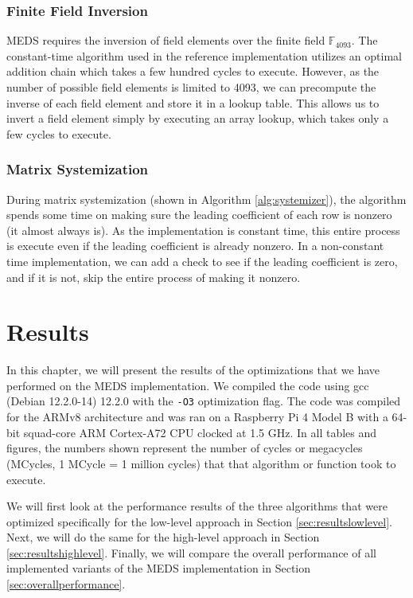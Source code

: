 \documentclass[11pt,a4paper]{report}
\theoremstyle{definition}
\begin{document}
\subsection{Finite Field Inversion}
MEDS requires the inversion of field elements over the finite field $\mathbb{F}_{4093}$. The constant-time algorithm used in the reference implementation utilizes an optimal addition chain which takes a few hundred cycles to execute. However, as the number of possible field elements is limited to 4093, we can precompute the inverse of each field element and store it in a lookup table. This allows us to invert a field element simply by executing an array lookup, which takes only a few cycles to execute.

\subsection{Matrix Systemization}
During matrix systemization (shown in Algorithm \ref{alg:systemizer}), the algorithm spends some time on making sure the leading coefficient of each row is nonzero (it almost always is). As the implementation is constant time, this entire process is execute even if the leading coefficient is already nonzero. In a non-constant time implementation, we can add a check to see if the leading coefficient is zero, and if it is not, skip the entire process of making it nonzero.

\chapter{Results}
\label{ch:results}
In this chapter, we will present the results of the optimizations that we have performed on the MEDS implementation. We compiled the code using gcc (Debian 12.2.0-14) 12.2.0 with the \texttt{-O3} optimization flag. The code was compiled for the ARMv8 architecture and was ran on a Raspberry Pi 4 Model B with a 64-bit squad-core ARM Cortex-A72 CPU clocked at 1.5 GHz. In all tables and figures, the numbers shown represent the number of cycles or megacycles (MCycles, 1 MCycle = 1 million cycles) that that algorithm or function took to execute.

We will first look at the performance results of the three algorithms that were optimized specifically for the low-level approach in Section \ref{sec:resultslowlevel}. Next, we will do the same for the high-level approach in Section \ref{sec:resultshighlevel}. Finally, we will compare the overall performance of all implemented variants of the MEDS implementation in Section \ref{sec:overallperformance}.
\end{document}
